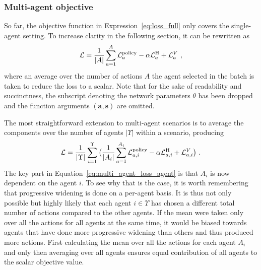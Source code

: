 \subsubsection{Multi-agent objective}\label{sssec:multi_agent_objective}
So far, the objective function in Expression~\ref{eq:loss_full} only covers the single-agent setting. To increase clarity in the following section, it can be rewritten as
\begin{gather}\label{eq:single_agent_loss_action}
    \mathcal L = \frac{1}{|A|} \sum_{a=1}^A \mathcal L_a^{\text{policy}} - \alpha \mathcal L_a^{\text H} + \mathcal L_a^V~,
\end{gather}
where an average over the number of actions $A$ the agent selected in the batch is taken to reduce the loss to a scalar. Note that for the sake of readability and succinctness, the subscript denoting the network parameters $\theta$ has been dropped and the function arguments $(\mathbf a, \mathbf s)$ are omitted.

The most straightforward extension to multi-agent scenarios is to average the components over the number of agents $|\Upsilon|$ within a scenario, producing
\begin{gather}\label{eq:multi_agent_loss_agent}
    \mathcal L = \frac{1}{|\Upsilon|} \sum_{i=1}^\Upsilon \big( \frac{1}{|A_i|} \sum_{a=1}^{A_i} \mathcal L_{a, i}^{\text{policy}} - \alpha \mathcal L_{a, i}^{\text H} + \mathcal L_{a, i}^V \big)~.
\end{gather}
The key part in Equation~\ref{eq:multi_agent_loss_agent} is that $A_i$ is now dependent on the agent $i$. To see why that is the case, it is worth remembering that progressive widening is done on a per-agent basis. It is thus not only possible but highly likely that each agent $i \in \Upsilon$ has chosen a different total number of actions compared to the other agents. If the mean were taken only over all the actions for all agents at the same time, it would be biased towards agents that have done more progressive widening than others and thus produced more actions. First calculating the mean over all the actions for each agent $A_i$ and only then averaging over all agents ensures equal contribution of all agents to the scalar objective value.

